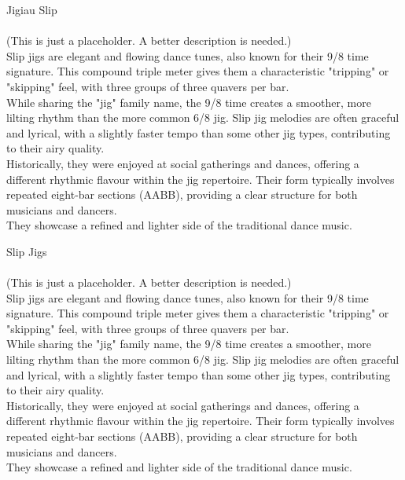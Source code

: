 \begin{multicols}{2}
    \Huge{Jigiau Slip}\\
    \vspace{1cm}\\
    \normalsize{
      \noindent 
      (This is just a placeholder. A better description is needed.)\\
      
      Slip jigs are elegant and flowing dance tunes, also known for their 9/8 time 
      signature. This compound triple meter gives them a characteristic "tripping" 
      or "skipping" feel, with three groups of three quavers per bar.\\
      
      While sharing the "jig" family name, the 9/8 time creates a smoother, 
      more lilting rhythm than the more common 6/8 jig. Slip jig melodies are often 
      graceful and lyrical, with a slightly faster tempo than some other jig types, 
      contributing to their airy quality.\\
      
      Historically, they were enjoyed at social gatherings and dances, offering a 
      different rhythmic flavour within the jig repertoire. Their form typically 
      involves repeated eight-bar sections (AABB), providing a clear structure for both 
      musicians and dancers.\\
      
      They showcase a refined and lighter side of the traditional dance music.
    }

    \newcolumn

    \Huge{Slip Jigs}\\
    \vspace{1cm}\\
    \normalsize{
      \noindent
      (This is just a placeholder. A better description is needed.)\\

      Slip jigs are elegant and flowing dance tunes, also known for their 9/8 time 
      signature. This compound triple meter gives them a characteristic "tripping" 
      or "skipping" feel, with three groups of three quavers per bar.\\
      
      While sharing the "jig" family name, the 9/8 time creates a smoother, 
      more lilting rhythm than the more common 6/8 jig. Slip jig melodies are often 
      graceful and lyrical, with a slightly faster tempo than some other jig types, 
      contributing to their airy quality.\\
      
      Historically, they were enjoyed at social gatherings and dances, offering a 
      different rhythmic flavour within the jig repertoire. Their form typically 
      involves repeated eight-bar sections (AABB), providing a clear structure for both 
      musicians and dancers.\\
      
      They showcase a refined and lighter side of the traditional dance music.
    }

    \end{multicols}